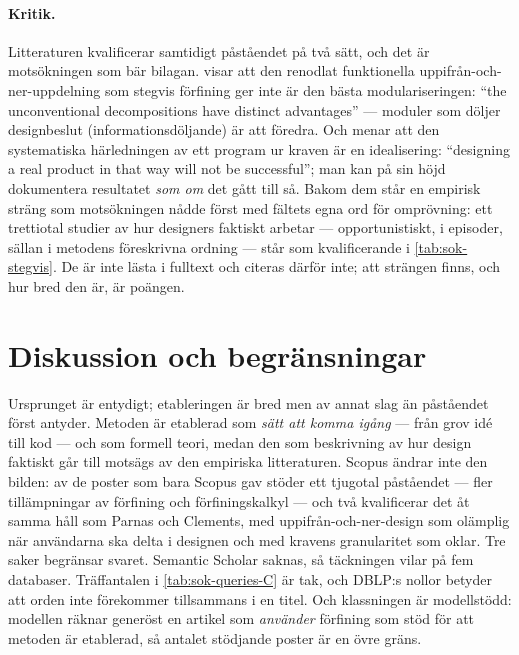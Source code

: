 \paragraph{Kritik.}  Litteraturen kvalificerar samtidigt påståendet på två
sätt, och det är motsökningen som bär bilagan.  \textcite{parnas1972}
visar att den renodlat funktionella uppifrån-och-ner-uppdelning som
stegvis förfining ger inte är den bästa modulariseringen: \enquote{the
unconventional decompositions have distinct advantages} --- moduler som
döljer designbeslut (informationsdöljande) är att föredra.  Och
\textcite{parnasClements1986} menar att den systematiska härledningen av
ett program ur kraven är en idealisering: \enquote{designing a real
product in that way will not be successful}; man kan på sin höjd
dokumentera resultatet \emph{som om} det gått till så.  Bakom dem står
en empirisk sträng som motsökningen nådde först med fältets egna ord för
omprövning: ett trettiotal studier av hur designers faktiskt arbetar ---
opportunistiskt, i episoder, sällan i metodens föreskrivna ordning ---
står som kvalificerande i \cref{tab:sok-stegvis}.  De är inte lästa i
fulltext och citeras därför inte; att strängen finns, och hur bred den
är, är poängen.

\section{Diskussion och begränsningar}
\label{sec:stegvis-diskussion}

Ursprunget är entydigt; etableringen är bred men av annat slag än
påståendet först antyder.  Metoden är etablerad som \emph{sätt att komma
igång} --- från grov idé till kod --- och som formell teori, medan den som
beskrivning av hur design faktiskt går till motsägs av den empiriska
litteraturen.  Scopus ändrar inte den bilden: av de poster som bara
Scopus gav stöder ett tjugotal påståendet --- fler tillämpningar av
förfining och förfiningskalkyl --- och två kvalificerar det åt samma håll
som Parnas och Clements, med uppifrån-och-ner-design som olämplig när
användarna ska delta i designen och med kravens granularitet som
oklar.  Tre saker begränsar svaret.  Semantic Scholar saknas, så
täckningen vilar på fem databaser.
Träffantalen i \cref{tab:sok-queries-C} är tak, och DBLP:s nollor betyder att orden inte förekommer
tillsammans i en titel.  Och klassningen är modellstödd: modellen räknar
generöst en artikel som \emph{använder} förfining som stöd för att
metoden är etablerad, så antalet stödjande poster är en övre gräns.

